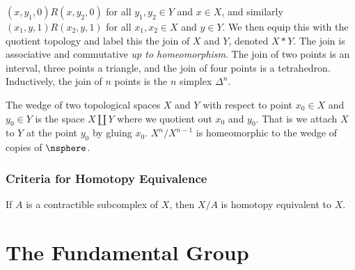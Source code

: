 \documentclass{book}                                                           %
\begin{document}
                $(x,y_{1},0)R(x,y_{2},0)$ for all $y_{1},y_{2}\in{Y}$ and
                $x\in{X}$, and similarly $(x_{1},y,1)R(x_{2},y,1)$ for all
                $x_{1},x_{2}\in{X}$ and $y\in{Y}$. We then equip this with the
                quotient topology and label this the join of $X$ and $Y$,
                denoted $X*Y$. The join is associative and commutative
                \textit{up to homeomorphism}. The join of two points is an
                interval, three points a triangle, and the join of four points
                is a tetrahedron. Inductively, the join of $n$ points is the
                $n$ simplex $\Delta^{n}$. 
                \par\hfill\par
                The wedge of two topological spaces $X$ and $Y$ with respect to
                point $x_{0}\in{X}$ and $y_{0}\in{Y}$ is the space
                $X\coprod{Y}$ where we quotient out $x_{0}$ and $y_{0}$. That is
                we attach $X$ to $Y$ at the point $y_{0}$ by gluing $x_{0}$.
                $X^{n}/X^{n-1}$ is homeomorphic to the wedge of copies of
                $\nsphere$.
                \par\hfill\par
            \subsection{Criteria for Homotopy Equivalence}
                If $A$ is a contractible subcomplex of $X$, then $X/A$ is
                homotopy equivalent to $X$.
\chapter{The Fundamental Group}
\end{document}
